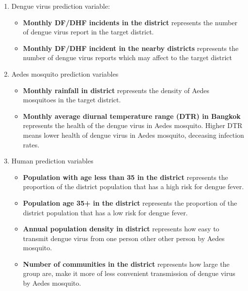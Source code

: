 \documentclass[review]{elsarticle}
\begin{document}
\begin{enumerate}
	\item Dengue virus prediction variable:
	\begin{itemize}
		\item \textbf{Monthly DF/DHF incidents in the district} represents the number of dengue virus report in the target district. 
		\item  \textbf{Monthly DF/DHF incident in the nearby districts} represents the number of dengue virus reports which may affect to the target district
	\end{itemize}
	\item Aedes mosquito prediction variables
		\begin{itemize}
			\item  \textbf{Monthly rainfall in district} represents the density of Aedes mosquitoes in the target district. 
			\item \textbf{Monthly average diurnal temperature range (DTR) in Bangkok} represents the health of the dengue virus in Aedes mosquito. Higher DTR means  lower health of dengue virus in Aedes mosquito, deceasing infection rates.
		\end{itemize}
	\item Human prediction variables
		\begin{itemize}
				\item \textbf{Population with age less than 35 in the district} represents the proportion of the district population that has a high risk for dengue fever. 
				
				\item \textbf{Population age 35+ in the district} represents the proportion of the district population that has a low risk for dengue fever.
				
				\item \textbf{Annual population density in district} represents how easy to transmit dengue virus from one person other other person by Aedes mosquito. 
				
				\item \textbf{Number of communities  in  the district} represents how large the group are, make it more of less convenient transmission of dengue virus by Aedes mosquito.
		\end{itemize}
\end{enumerate}
\end{document}
